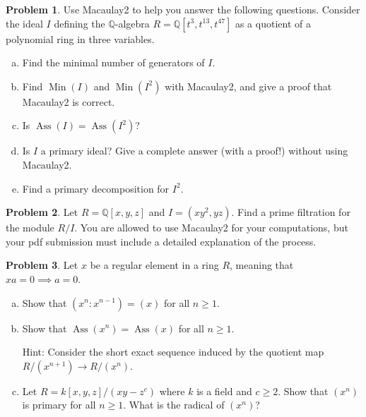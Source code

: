 \documentclass[11pt]{article}
\DeclareMathOperator{\Ass}{Ass}
\DeclareMathOperator{\Min}{Min}
\theoremstyle{definition}
\newtheorem{problem}{Problem}
\begin{document}
\begin{problem}
	Use Macaulay2 to help you answer the following questions. Consider the ideal $I$ defining the $\mathbb{Q}$-algebra $R=\mathbb{Q}[t^3,t^{13},t^{47}]$ as a quotient of a polynomial ring in three variables.
	\begin{enumerate}[(a)]
		\item Find the minimal number of generators of $I$.
		\item Find $\Min(I)$ and $\Min(I^2)$ with Macaulay2, and give a proof that Macaulay2 is correct.
		\item Is $\Ass(I) = \Ass(I^2)$?
		\item Is $I$ a primary ideal? Give a complete answer (with a proof!) without using Macaulay2.
		\item Find a primary decomposition for $I^2$.
	\end{enumerate}
\end{problem}


\begin{problem}
	Let $R = \mathbb{Q}[x,y,z]$ and $I = (xy^2,yz)$. Find a prime filtration for the module $R/I$. You are allowed to use Macaulay2 for your computations, but your pdf submission must include a detailed explanation of the process. 
\end{problem}


\begin{problem}
	Let $x$ be a regular element in a ring $R$, meaning that $xa = 0 \implies a = 0$. 
	\begin{enumerate}[a)]
		\item Show that $(x^n : x^{n-1}) = (x)$ for all $n \geqslant 1$.
		\item Show that $\Ass(x^n) = \Ass(x)$ for all $n \geqslant 1$.
		
		\noindent
		Hint: Consider the short exact sequence induced by the quotient map $R/(x^{n+1}) \to R/(x^n)$.
		
		\item Let $R = k[x,y,z]/(xy-z^c)$ where $k$ is a field and $c \geqslant 2$. Show that $(x^n)$ is primary for all $n \geqslant 1$. What is the radical of $(x^n)$?
	\end{enumerate}	
\end{problem}


\newpage

\noindent
{}
\end{document}
